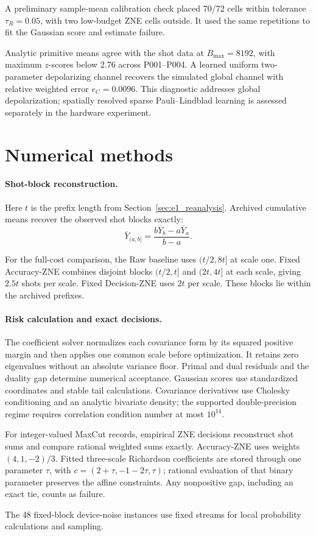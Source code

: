 \documentclass[a4paper,onecolumn,unpublished,nopdfoutputerror]{quantumarticle}
\theoremstyle{plain}
\theoremstyle{definition}
\newcommand{\1}{\mathbf{1}}
\begin{document}
A preliminary sample-mean calibration check placed 70/72 cells within tolerance $\tau_R=0.05$, with two low-budget ZNE cells outside. It used the same repetitions to fit the Gaussian score and estimate failure.

Analytic primitive means agree with the shot data at $B_{\max}=8192$, with maximum $z$-scores below 2.76 across P001--P004. A learned uniform two-parameter depolarizing channel recovers the simulated global channel with relative weighted error $e_C=0.0096$. This diagnostic addresses global depolarization; spatially resolved sparse Pauli--Lindblad learning is assessed separately in the hardware experiment.

\FloatBarrier
\section{Numerical methods}
\label{app:implementation_checks}

\paragraph{Shot-block reconstruction.}
Here $t$ is the prefix length from Section~\ref{sec:e1_reanalysis}. Archived cumulative means recover the observed shot blocks exactly:
\[
\overline Y_{(a,b]}=\frac{b\overline Y_b-a\overline Y_a}{b-a}.
\]

For the full-cost comparison, the Raw baseline uses $(t/2,8t]$ at scale one. Fixed Accuracy-ZNE combines disjoint blocks $(t/2,t]$ and $(2t,4t]$ at each scale, giving $2.5t$ shots per scale. Fixed Decision-ZNE uses $2t$ per scale. These blocks lie within the archived prefixes.

\paragraph{Risk calculation and exact decisions.}
The coefficient solver normalizes each covariance form by its squared positive margin and then applies one common scale before optimization. It retains zero eigenvalues without an absolute variance floor. Primal and dual residuals and the duality gap determine numerical acceptance. Gaussian scores use standardized coordinates and stable tail calculations. Covariance derivatives use Cholesky conditioning and an analytic bivariate density; the supported double-precision regime requires correlation condition number at most $10^{14}$.

For integer-valued MaxCut records, empirical ZNE decisions reconstruct shot sums and compare rational weighted sums exactly. Accuracy-ZNE uses weights $(4,1,-2)/3$. Fitted three-scale Richardson coefficients are stored through one parameter $\tau$, with $c=(2+\tau,-1-2\tau,\tau)$; rational evaluation of that binary parameter preserves the affine constraints. Any nonpositive gap, including an exact tie, counts as failure.

The 48 fixed-block device-noise instances use fixed streams for local probability calculations and sampling.
\end{document}
